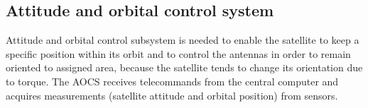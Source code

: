 \subsection{Attitude and orbital control system}
Attitude and orbital control subsystem is needed to enable the satellite to keep a specific position within its orbit and to control the antennas in order to remain oriented to assigned area, because the satellite tends to change its orientation due to torque. The AOCS receives telecommands from the central computer and acquires measurements (satellite attitude and orbital position) from sensors.

%






